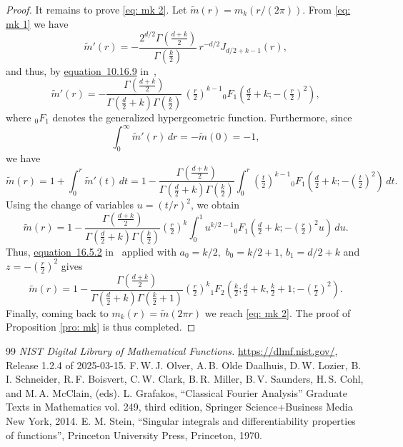 \documentclass[10pt,a4paper]{amsart}
\newcommand{\tm}{\tilde{m}}
\begin{document}
\begin{proof}
It remains to prove \eqref{eq: mk 2}.  Let $\tm(r)=m_k(r/(2\pi))$. From \eqref{eq: mk 1} we have 
\[
    \tm'(r) = -\frac{2^{d/2} \Gamma(\frac{d + k}{2})}{\Gamma(\frac{k}{2})}\, r^{-d/2} J_{d/2 + k - 1}(r) ,
\]
and thus, by \href{https://dlmf.nist.gov/10.16.E9}{equation~10.16.9} in~\cite{dlmf},
\[
 \tm'(r) = -\frac{\Gamma(\frac{d + k}{2})}{\Gamma(\frac{d}{2} + k) \Gamma(\frac{k}{2})}  \, (\tfrac{r}{2})^{k - 1} {_0F_1}(\tfrac{d}{2} + k; -(\tfrac{r}{2})^2),
\]
where $_0F_1$ denotes the generalized hypergeometric function. Furthermore, since 
\[
 \int_0^\infty \tm'(r) \, dr = -\tm(0) =  -1 , 
\]
we have
\begin{equation*}
 \tm(r) = 1 + \int_0^r \tm'(t) \, dt = 1- \frac{\Gamma(\frac{d + k}{2})}{\Gamma(\frac{d}{2} + k) \Gamma(\frac{k}{2})} \int_{0}^r (\tfrac{t}{2})^{k - 1} {_0F_1}(\tfrac{d}{2} + k; -(\tfrac{t}{2})^2) \, dt.
\end{equation*}
Using the change of variables $u= (t/r)^2$, we obtain
\begin{equation*}
\tm(r)=1-\frac{\Gamma(\frac{d + k}{2})}{\Gamma(\frac{d}{2} + k)\Gamma(\frac{k}{2})}(\tfrac{r}{2})^{k}\int_{0}^1 u^{k/2 - 1} {_0F_1}(\tfrac{d}{2} + k; -(\tfrac{r}{2})^2u) \, du.
\end{equation*}
Thus, \href{https://dlmf.nist.gov/16.5.E2}{equation~16.5.2} in~\cite{dlmf} applied with $a_0=k/2,$ $b_0=k/2+1$, $b_1=d/2+k$ and $z=-(\tfrac{r}{2})^2$ gives
\[
    \tm(r)=1-\frac{\Gamma(\frac{d + k}{2})}{\Gamma(\frac{d}{2} + k)\Gamma(\frac{k}{2}+1)}(\tfrac{r}{2})^k {_1F_2}(\tfrac{k}{2}; \tfrac{d}{2} + k, \tfrac{k}{2} + 1; -(\tfrac{r}{2})^2).
\]
Finally, coming back to $m_k(r)=\tm(2\pi r)$ we reach \eqref{eq: mk 2}. The proof of Proposition \ref{pro: mk} is thus completed.







\end{proof}

\begin{thebibliography}{99}
 \emph{NIST Digital Library of Mathematical Functions.} \url{https://dlmf.nist.gov/}, Release 1.2.4 of 2025-03-15. F.\,W.\,J. Olver, A.\,B. Olde Daalhuis, D.\,W. Lozier, B.\,I. Schneider, R.\,F. Boisvert, C.\,W. Clark, B.\,R. Miller, B.\,V. Saunders, H.\,S. Cohl, and M.\,A. McClain, (eds).
 L. Grafakos, ``Classical Fourier Analysis'' Graduate Texts in Mathematics vol. 249, third edition, Springer Science+Business Media New York, 2014.
 E. M. Stein, ``Singular integrals and differentiability properties of functions'', Princeton University Press, Princeton, 1970. %
\end{thebibliography}
\end{document}
